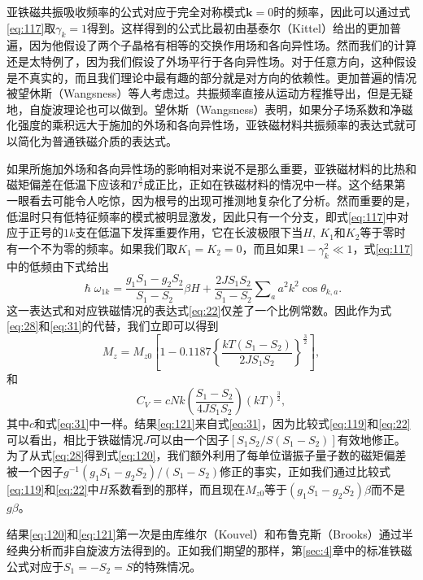 \documentclass{article}
\begin{document}
亚铁磁共振吸收频率的公式对应于完全对称模式$\mathbf{k}=0$时的频率，因此可以通过式\eqref{eq:117}取$\gamma_k=1$得到。这样得到的公式比最初由基泰尔（Kittel）给出的更加普遍，因为他假设了两个子晶格有相等的交换作用场和各向异性场。然而我们的计算还是太特例了，因为我们假设了外场平行于各向异性场。对于任意方向，这种假设是不真实的，而且我们理论中最有趣的部分就是对方向的依赖性。更加普遍的情况被望休斯（Wangsness）等人考虑过。共振频率直接从运动方程推导出，但是无疑地，自旋波理论也可以做到。望休斯（Wangsness）表明，如果分子场系数和净磁化强度的乘积远大于施加的外场和各向异性场，亚铁磁材料共振频率的表达式就可以简化为普通铁磁介质的表达式。

如果所施加外场和各向异性场的影响相对来说不是那么重要，亚铁磁材料的比热和磁矩偏差在低温下应该和$T^\frac{3}{2}$成正比，正如在铁磁材料的情况中一样。这个结果第一眼看去可能令人吃惊，因为根号的出现可推测地复杂化了分析。然而重要的是，低温时只有低特征频率的模式被明显激发，因此只有一个分支，即式\eqref{eq:117}中对应于正号的$1k$支在低温下发挥重要作用，它在长波极限下当$H,~K_1$和$K_2$等于零时有一个不为零的频率。如果我们取$K_1=K_2=0$，而且如果$1-\gamma_k^2\ll 1$，式\eqref{eq:117}中的低频由下式给出
\begin{equation} \label{eq:119}
\hslash\omega_{1k}=\frac{g_1S_1-g_2S_2}{S_1-S_2}\beta H+\frac{2JS_1S_2}{S_1-S_2}\sum\nolimits_aa^2k^2\cos\theta_{k,a}.
\end{equation}
这一表达式和对应铁磁情况的表达式\eqref{eq:22}仅差了一个比例常数。因此作为式\eqref{eq:28}和\eqref{eq:31}的代替，我们立即可以得到
\begin{equation} \label{eq:120}
M_z=M_{z0}\left[1-0.1187\left\{\frac{kT(S_1-S_2)}{2JS_1S_2}\right\}^\frac{3}{2}\right],
\end{equation} 
和
\begin{equation} \label{eq:121}
C_V=cNk\left(\frac{S_1-S_2}{4JS_1S_2}\right)(kT)^\frac{3}{2},
\end{equation}
其中$c$和式\eqref{eq:31}中一样。结果\eqref{eq:121}来自式\eqref{eq:31}，因为比较式\eqref{eq:119}和\eqref{eq:22}可以看出，相比于铁磁情况$J$可以由一个因子$[S_1S_2/S(S_1-S_2)]$有效地修正。为了从式\eqref{eq:28}得到式\eqref{eq:120}，我们额外利用了每单位谐振子量子数的磁矩偏差被一个因子$g^{-1}(g_1S_1-g_2S_2)/(S_1-S_2)$修正的事实，正如我们通过比较式\eqref{eq:119}和\eqref{eq:22}中$H$系数看到的那样，而且现在$M_{z0}$等于$(g_1S_1-g_2S_2)\beta$而不是$g\beta$。

结果\eqref{eq:120}和\eqref{eq:121}第一次是由库维尔（Kouvel）和布鲁克斯（Brooks）通过半经典分析而非自旋波方法得到的。正如我们期望的那样，第\ref{sec:4}章中的标准铁磁公式对应于$S_1=-S_2=S$的特殊情况。
\end{document}
